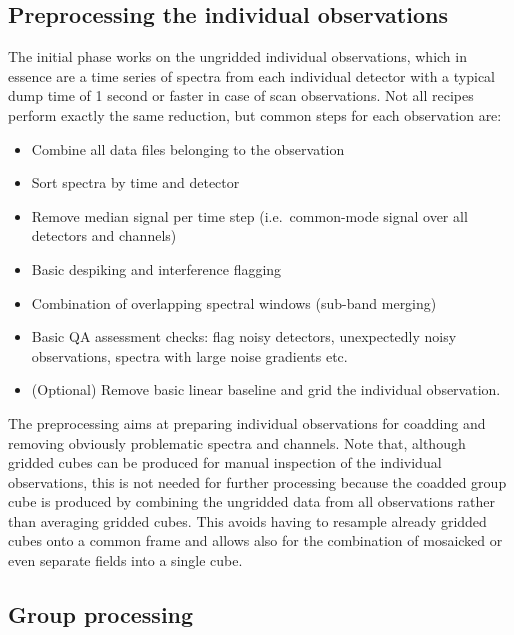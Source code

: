 \documentclass[a4paper,fleqn,usenatbib]{mnras}
\begin{document}
\subsection{Preprocessing the individual observations}

The initial phase works on the ungridded individual observations,
which in essence are a time series of spectra from each individual
detector with a typical dump time of 1 second or faster in case of scan
observations.  Not all recipes perform exactly the same reduction, but
common steps for each observation are:
\begin{itemize}
\item Combine all data files belonging to the observation
\item Sort spectra by time and detector
\item Remove median signal per time step (i.e.\ common-mode signal over
all detectors and channels)
\item Basic despiking and interference flagging
\item Combination of overlapping spectral windows (sub-band merging)
\item Basic QA assessment checks: flag noisy detectors, unexpectedly noisy
observations, spectra with large noise gradients etc.
\item (Optional) Remove basic linear baseline and grid the individual
observation.
\end{itemize}

The preprocessing aims at preparing individual observations for
coadding and removing obviously problematic spectra and channels.
Note that, although gridded cubes can be produced for manual
inspection of the individual observations, this is not needed for
further processing because the coadded group cube is produced by
combining the ungridded data from all observations rather than
averaging gridded cubes.  This avoids having to resample already
gridded cubes onto a common frame and allows also for the combination
of mosaicked or even separate fields into a single cube.

\subsection{Group processing}
\end{document}
